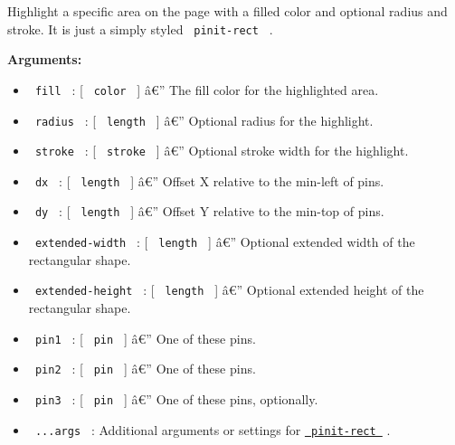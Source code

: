Highlight a specific area on the page with a filled color and optional
radius and stroke. It is just a simply styled \texttt{\ pinit-rect\ } .

\begin{Shaded}
\begin{Highlighting}[]
\end{Highlighting}
\end{Shaded}

\textbf{Arguments:}

\begin{itemize}
\tightlist
\item
  \texttt{\ fill\ } : {[} \texttt{\ color\ } {]} â€'' The fill color for
  the highlighted area.
\item
  \texttt{\ radius\ } : {[} \texttt{\ length\ } {]} â€'' Optional radius
  for the highlight.
\item
  \texttt{\ stroke\ } : {[} \texttt{\ stroke\ } {]} â€'' Optional stroke
  width for the highlight.
\item
  \texttt{\ dx\ } : {[} \texttt{\ length\ } {]} â€'' Offset X relative
  to the min-left of pins.
\item
  \texttt{\ dy\ } : {[} \texttt{\ length\ } {]} â€'' Offset Y relative
  to the min-top of pins.
\item
  \texttt{\ extended-width\ } : {[} \texttt{\ length\ } {]} â€''
  Optional extended width of the rectangular shape.
\item
  \texttt{\ extended-height\ } : {[} \texttt{\ length\ } {]} â€''
  Optional extended height of the rectangular shape.
\item
  \texttt{\ pin1\ } : {[} \texttt{\ pin\ } {]} â€'' One of these pins.
\item
  \texttt{\ pin2\ } : {[} \texttt{\ pin\ } {]} â€'' One of these pins.
\item
  \texttt{\ pin3\ } : {[} \texttt{\ pin\ } {]} â€'' One of these pins,
  optionally.
\item
  \texttt{\ ...args\ } : Additional arguments or settings for
  \href{https://github.com/typst/packages/raw/main/packages/preview/pinit/0.2.2/\#pinit-rect}{\texttt{\ pinit-rect\ }}
  .
\end{itemize}

